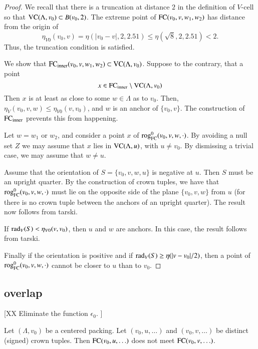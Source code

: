 \begin{proof}
We recall that there is a truncation at distance $2$ in the definition
of $V$-cell so that ${\operatorname{VC}}(\Lambda,v_0)\subset B(v_0,2)$.
The extreme point of ${\operatorname{FC}}(v_0,v,w_1,w_2)$ has distance from the origin of
 $$\eta_{V0}(v_0,v) = \eta(|v_0-v|,2,2.51)\le \eta(\sqrt8,2,2.51) < 2.$$
Thus, the truncation condition is satisfied.

We show that ${\operatorname{FC}}_{\text{inner}}(v_0,v,w_1,w_2)\subset{\operatorname{VC}}(\Lambda,v_0)$.
Suppose to the contrary, that a point 
  $$x\in {\operatorname{FC}}_{\text{inner}}\setminus {\operatorname{VC}}(\Lambda,v_0)$$
Then $x$ is at least as close
to some $w\in\Lambda$ as to  $v_0$.  
Then, $\eta_V(v_0,v,w)\le\eta_{V0}(v,v_0)$, and $w$
is an anchor of $\{v_0,v\}$.  The construction of
${\operatorname{FC}}_{\text{inner}}$ prevents this from happening.

Let $w=w_1$ or $w_2$, and
consider a point $x$ of ${\operatorname{rog}}^0_{\text{FC}}(v_0,v,w,\cdot)$.
By avoiding a null set $Z$ we may assume that $x$ lies in
${\operatorname{VC}}(\Lambda,u)$, with $u\ne v_0$.  
By dismissing a trivial case, we may
assume that $w\ne u$.

Assume that the orientation of $S=\{v_0,v,w,u\}$ is negative at $u$.  
Then $S$ must be an upright quarter.  By
the construction of crown tuples, we have that ${\operatorname{rog}}^0_{\text{FC}}(v_0,v,w,\cdot)$ must
lie on the opposite side of the plane $\{v_0,v,w\}$ from $u$ (for
there is no crown tuple between the anchors of an upright quarter).  The
result now follows from tarski.

If $\operatorname{rad}_V(S) <\eta_{V0}(v,v_0)$, then $u$ and $w$ are anchors.  In
this case, the result follows from tarski.

Finally if the orientation is positive and if $\operatorname{rad}_V(S)\ge
\eta(|v-v_0|/2)$, then a point of ${\operatorname{rog}}^0_{\text{FC}}(v_0,v,w,\cdot)$ cannot be closer to $u$ than
to $v_0$.
\end{proof}


\subsection{overlap}%
    \label{sec:overlap}

[XX Eliminate the function $\epsilon_0$.  ]

\begin{lemma}
Let $(\Lambda,v_0)$ be a centered packing.  Let $(v_0,u,\ldots)$
and $(v_0,v,\ldots)$ be distinct (signed) crown tuples.
Then ${\operatorname{FC}}(v_0,u,\ldots)$ does not meet ${\operatorname{FC}}(v_0,v,\ldots)$.
\end{lemma}

